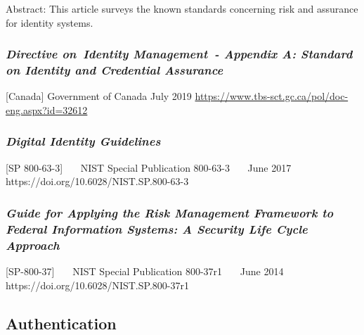 Abstract: This article surveys the known standards concerning risk and
assurance for identity systems.

\hypertarget{directive-onidentity-management--appendix-a-standard-on-identity-and-credential-assurance}{%
\subsubsection{\texorpdfstring{\emph{Directive on~Identity Management~-
Appendix A: Standard on Identity and Credential
Assurance}}{Directive on~Identity Management~- Appendix A: Standard on Identity and Credential Assurance}}\label{directive-onidentity-management--appendix-a-standard-on-identity-and-credential-assurance}}

{[}Canada{]} Government of Canada July 2019
\url{https://www.tbs-sct.gc.ca/pol/doc-eng.aspx?id=32612}

\hypertarget{digital-identity-guidelines}{%
\subsubsection{\texorpdfstring{\emph{Digital Identity
Guidelines}}{Digital Identity Guidelines}}\label{digital-identity-guidelines}}

{[}SP 800-63-3{]}~~~ NIST Special Publication 800-63-3~~~ June 2017~~~
https://doi.org/10.6028/NIST.SP.800-63-3~~~

\hypertarget{guide-for-applying-the-risk-management-framework-to-federal-information-systems-a-security-life-cycle-approach}{%
\subsubsection{\texorpdfstring{\emph{Guide for Applying the Risk Management
Framework to Federal Information Systems: A Security Life Cycle
Approach}}{Guide for Applying the Risk Management Framework to Federal Information Systems: A Security Life Cycle Approach}}\label{guide-for-applying-the-risk-management-framework-to-federal-information-systems-a-security-life-cycle-approach}}

{[}SP-800-37{]}~~~ NIST Special Publication 800-37r1~~~ June 2014~~~
https://doi.org/10.6028/NIST.SP.800-37r1~~~

\hypertarget{authentication-1}{%
\subsection{Authentication}\label{authentication-1}}


